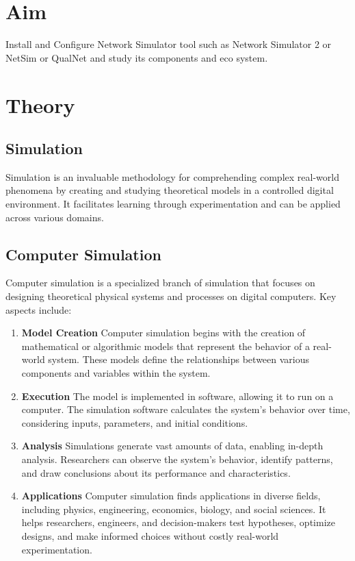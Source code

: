 \documentclass[11pt]{article}
\begin{document}
\tableofcontents
\thispagestyle{empty}
\clearpage

\setcounter{page}{1}

\section{Aim}
Install and Configure Network Simulator tool such as Network Simulator 2 or
NetSim or QualNet and study its components and eco system.

\section{Theory}

\subsection{Simulation}
Simulation is an invaluable methodology for comprehending complex real-world phenomena by creating and studying theoretical models in a controlled digital environment. It facilitates learning through experimentation and can be applied across various domains.


\subsection{Computer Simulation}
Computer simulation is a specialized branch of simulation that focuses on designing theoretical physical systems and processes on digital computers. Key aspects include:

\begin{enumerate}
    \item \textbf{Model Creation} Computer simulation begins with the creation of mathematical or algorithmic models that represent the behavior of a real-world system. These models define the relationships between various components and variables within the system.

    \item \textbf{Execution} The model is implemented in software, allowing it to run on a computer. The simulation software calculates the system's behavior over time, considering inputs, parameters, and initial conditions.

    \item \textbf{Analysis} Simulations generate vast amounts of data, enabling in-depth analysis. Researchers can observe the system's behavior, identify patterns, and draw conclusions about its performance and characteristics.

    \item \textbf{Applications} Computer simulation finds applications in diverse fields, including physics, engineering, economics, biology, and social sciences. It helps researchers, engineers, and decision-makers test hypotheses, optimize designs, and make informed choices without costly real-world experimentation.
\end{enumerate}
\end{document}
